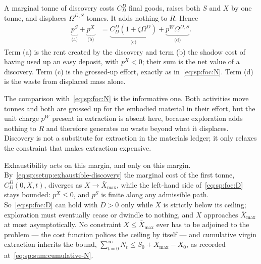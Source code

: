  A marginal tonne of discovery costs $C^D_D$ final goods, raises both $S$ and $X$ by one tonne, and displaces $\Omega^{D,S}$ tonnes. It adds nothing to $R$. Hence
\begin{align}
\underbrace{p^S}_{\text{(a)}}+\underbrace{p^X}_{\text{(b)}} &= \underbrace{C^D_D\left(1+\zeta\Omega^D\right)}_{\text{(c)}}+\underbrace{p^W\Omega^{D,S}}_{\text{(d)}} .
\label{eq:sp:foc:D}
\end{align}
Term (a) is the rent created by the discovery and term (b) the shadow cost of having used up an easy deposit, with $p^X<0$; their sum is the net value of a discovery. Term (c) is the grossed-up effort, exactly as in~\eqref{eq:sp:foc:N}. Term (d) is the waste from displaced mass alone.

The comparison with~\eqref{eq:sp:foc:N} is the informative one. Both activities move tonnes and both are grossed up for the embodied material in their effort, but the unit charge $p^W$ present in extraction is absent here, because exploration adds nothing to $R$ and therefore generates no waste beyond what it displaces. Discovery is not a substitute for extraction in the materials ledger; it only relaxes the constraint that makes extraction expensive.

Exhaustibility acts on this margin, and only on this margin. By~\eqref{eq:sp:setup:exhaustible-discovery} the marginal cost of the first tonne, $C^D_D\left(0,X,t\right)$, diverges as $X\to\bar X_{\max}$, while the left-hand side of~\eqref{eq:sp:foc:D} stays bounded: $p^X\le0$, and $p^S$ is finite along any admissible path. So~\eqref{eq:sp:foc:D} can hold with $D>0$ only while $X$ is strictly below its ceiling; exploration must eventually cease or dwindle to nothing, and $X$ approaches $\bar X_{\max}$ at most asymptotically. No constraint $X\le\bar X_{\max}$ ever has to be adjoined to the problem --- the cost function polices the ceiling by itself --- and cumulative virgin extraction inherits the bound, $\sum_{t=0}^\infty N_t\le S_0+\bar X_{\max}-X_0$, as recorded at~\eqref{eq:sp:sum:cumulative-N}.

